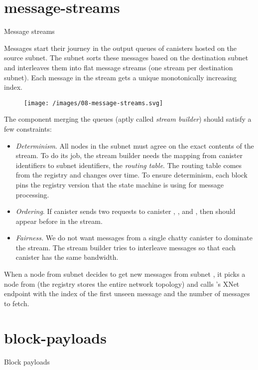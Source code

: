 \documentclass{article}
\begin{document}
\section{message-streams}{Message streams}

Messages start their journey in the output queues of canisters hosted on the source subnet.
The subnet sorts these messages based on the destination subnet and interleaves them into flat message streams (one stream per destination subnet).
Each message in the stream gets a unique monotonically increasing index.

\begin{figure}[grayscale-diagram]
  \texttt{[image: /images/08-message-streams.svg]}
\end{figure}

The component merging the queues (aptly called \emph{stream builder}) should satisfy a few constraints:
\begin{itemize}
  \item
  \emph{Determinism}.
  All nodes in the subnet must agree on the exact contents of the stream.
  To do its job, the stream builder needs the mapping from canister identifiers to subnet identifiers, the \emph{routing table}.
  The routing table comes from the registry and changes over time.
  To ensure determinism, each block pins the registry version that the state machine is using for message processing.
  \item
  \emph{Ordering}.
  If canister  sends two requests to canister , , and , then  should appear before  in the stream.
  \item
  \emph{Fairness.}
  We do not want messages from a single chatty canister to dominate the stream.
  The stream builder tries to interleave messages so that each canister has the same bandwidth.
\end{itemize}

When a node from subnet  decides to get new messages from subnet , it picks a node from  (the registry stores the entire network topology) and calls 's XNet endpoint with the index of the first unseen message and the number of messages to fetch.

\section{block-payloads}{Block payloads}
\end{document}

